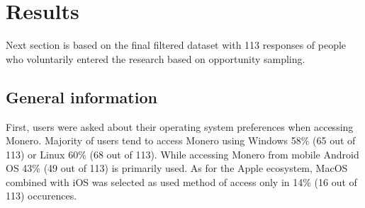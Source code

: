 \documentclass[
  printed, %
  table,   %
  lof,     %
  lot,     %
           oneside, color
]{fithesis3}
\begin{document}

\section{Results}
Next section is based on the final filtered dataset with 113 responses of people who voluntarily entered the research based on opportunity sampling.
\subsection{General information}
First, users were asked about their operating system preferences when accessing Monero. Majority of users tend to access Monero using Windows 58\% (65 out of 113) or Linux 60\% (68 out of 113). While accessing Monero from mobile Android OS 43\% (49 out of 113) is primarily used. As for the Apple ecosystem, MacOS combined with iOS was selected as used method of access only in 14\% (16 out of 113) occurences.
\end{document}
